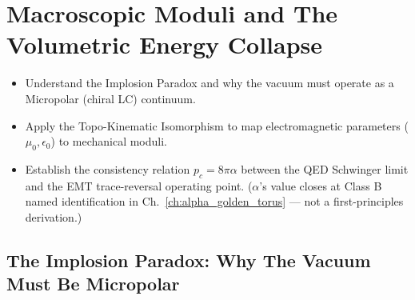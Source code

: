 \chapter{Macroscopic Moduli and The Volumetric Energy Collapse}
\label{ch:macroscopic_moduli}

\begin{objectivebox}
\begin{itemize}
    \item Understand the Implosion Paradox and why the vacuum must operate as a Micropolar (chiral LC) continuum.
    \item Apply the Topo-Kinematic Isomorphism to map electromagnetic parameters ($\mu_0, \epsilon_0$) to mechanical moduli.
    \item Establish the consistency relation $p_c = 8\pi\alpha$ between the QED Schwinger limit and the EMT trace-reversal operating point. ($\alpha$'s value closes at Class B named identification in Ch.~\ref{ch:alpha_golden_torus} --- not a first-principles derivation.)
\end{itemize}
\end{objectivebox}

\section{The Implosion Paradox: Why The Vacuum Must Be Micropolar}

